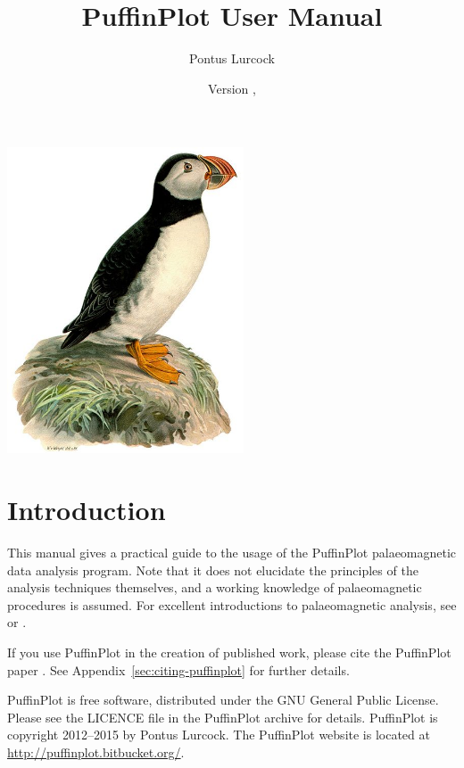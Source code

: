 \documentclass[a4paper,british]{article}
\title{PuffinPlot User Manual}
\author{Pontus Lurcock}
\date{Version \HgVersion, \HgDate}
\newcommand{\ppcmd}[1]{\textsf{#1}} %
\begin{document}
\maketitle
\begin{center}
\includegraphics[width=70mm]{figures/Fratercula_arctica.jpeg}
\end{center}

\tableofcontents

\clearpage

\section{Introduction}

This manual gives a practical guide to the usage of the PuffinPlot
palaeomagnetic data analysis program. Note that it does not elucidate the
principles of the analysis techniques themselves, and a working knowledge of
palaeomagnetic procedures is assumed. For excellent introductions to
palaeomagnetic analysis, see \cite{tauxe2010paleomagnetism} or
\cite{butler1992paleomagnetism}.

If you use PuffinPlot in the creation of published work, please cite the
PuffinPlot paper \citep{lurcock2012puffinplot}. See
Appendix~\ref{sec:citing-puffinplot} for further details.

PuffinPlot is free software, distributed under the GNU General Public
License. Please see the \ppcmd{LICENCE} file in the PuffinPlot archive
for details. PuffinPlot is copyright 2012--2015 by Pontus Lurcock. The
PuffinPlot website is located at \url{http://puffinplot.bitbucket.org/}.
\end{document}
